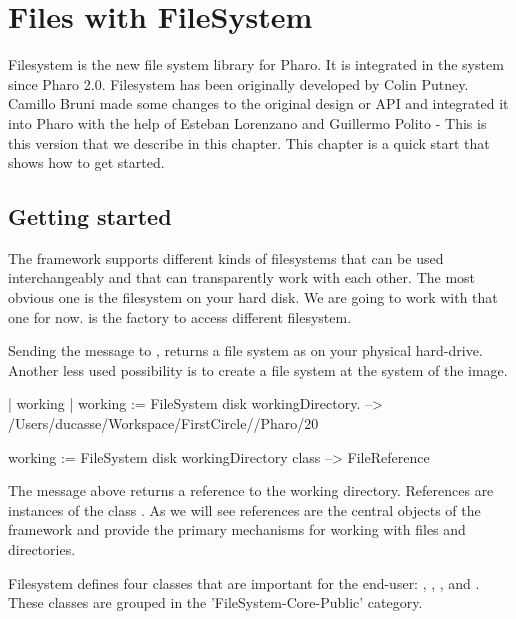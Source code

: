 \documentclass[a4paper,10pt,twoside]{book}
\begin{document}
\fi
\sloppy
\chapter{Files with FileSystem }
 
Filesystem is the new file system library for Pharo. It is integrated in the system since Pharo 2.0. 
Filesystem has been originally developed by Colin Putney. Camillo Bruni made some changes to the original design or API and integrated it into Pharo with the help of Esteban Lorenzano and Guillermo Polito - This is this version that we describe in this chapter. This chapter is a quick start that shows how to get started. 

\section{Getting started}
The framework supports different kinds of filesystems that can be used interchangeably and that can transparently work with each other. The most obvious one is the filesystem on your hard disk. We are going to work with that one for now. 
 is the factory to access different filesystem. 

Sending the message  to , returns a file system as on your physical hard-drive. Another less used possibility is  to create a file system at the system of the image. 

\begin{code}{}
| working |
working := FileSystem disk workingDirectory.
--> /Users/ducasse/Workspace/FirstCircle//Pharo/20

working := FileSystem disk workingDirectory class 
--> FileReference
\end{code} 

The message  above returns a reference to the working directory. References are instances of the class .  As we will see references are the central objects of the framework and provide the primary mechanisms for working with files and directories. 

Filesystem defines four classes that are important for the end-user: , , , and . These classes are grouped in the 'FileSystem-Core-Public' category.
\end{document}

